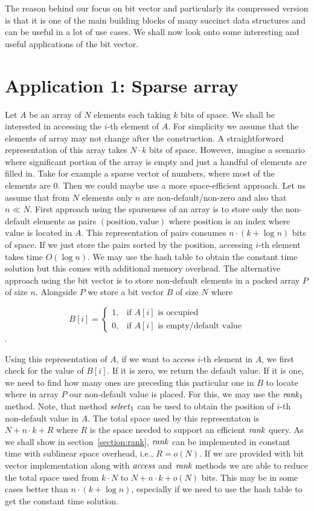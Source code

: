 The reason behind our focus on bit vector and particularly its compressed version
is that it is one of the main building blocks of many succinct data structures and can be
useful in a lot of use cases. We shall now look onto some interesting and useful applications
of the bit vector.


\section{Application 1: Sparse array}

Let $A$ be an array of $N$ elements each taking $k$ bits of space. We shall be interested in
accessing the $i$-th element of $A$. For simplicity we assume that the elements of array may
not change after the construction. A straightforward representation of this array takes $N\cdot k$
bits of space. However, imagine a scenario where significant portion of the array is empty
and just a handful of elements are filled in. Take for example a sparse vector of numbers,
where most of the elements are 0. Then we could maybe use a more space-efficient approach.
Let us assume that from $N$ elements only $n$ are non-default/non-zero and also that $n\ll N$.
First approach using the sparseness of an array is to store only the non-default elements as
pairs $(\text{position}, \text{value})$ where $\text{position}$ is an index where $\text{value}$
is located in $A$. This representation of pairs consumes $n\cdot (k+\log n)$ bits of space.
If we just store the pairs sorted by the position, accessing $i$-th element takes time $O(\log n)$.
We may use the hash table to obtain the constant time solution but this comes with additional
memory overhead. The alternative approach using the bit vector is to store non-default elements in
a packed array $P$ of size $n$. Alongside $P$ we store a bit vector $B$ of size $N$ where

\[
   B[i]=
\begin{cases}
   1,& \text{if $A[i]$ is occupied} \\
   0,& \text{if $A[i]$ is empty/default value}
\end{cases}
\].

Using this representation of $A$, if we want to access $i$-th element in $A$, we first check for
the value of $B[i]$. If it is zero, we return the default value. If it is one, we need to find
how many ones are preceding this particular one in $B$ to locate where in array $P$ our non-default
value is placed. For this, we may use the $\mathit{rank}_1$ method. Note, that method $\mathit{select}_1$ can
be used to obtain the position of $i$-th non-default value in $A$. The total space used by this
representaton is $N+n\cdot k+R$ where $R$ is the space needed to support an efficient $\mathit{rank}$ query.
As we shall show in section~\ref{section:rank}, $\mathit{rank}$ can be implemented in constant time with
sublinear space overhead, i.e., $R = o(N)$. If we are provided with bit vector implementation along
with $\mathit{access}$ and $\mathit{rank}$ methods we are able to reduce the total space used from $k\cdot N$ to
$N+n\cdot k+o(N)$ bits. This may be in some cases better than $n\cdot (k+\log n)$, especially if
we need to use the hash table to get the constant time solution.

